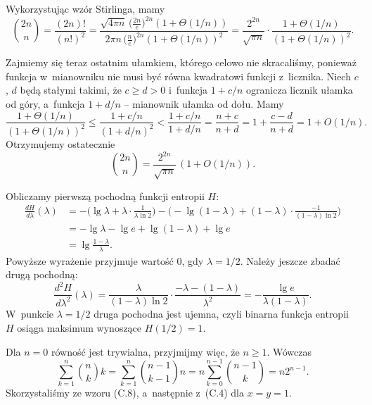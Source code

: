 \exercise %
Wykorzystując wzór Stirlinga, mamy
\[
	\binom{2n}{n} = \frac{(2n)!}{(n!)^2} = \frac{\sqrt{4\pi n}\,\bigl(\frac{2n}{e}\bigr)^{2n}(1+\Theta(1/n))}{2\pi n\,\bigl(\frac{n}{e}\bigr)^{2n}(1+\Theta(1/n))^2} = \frac{2^{2n}}{\sqrt{\pi n}}\cdot\frac{1+\Theta(1/n)}{(1+\Theta(1/n))^2}.
\]

Zajmiemy się teraz ostatnim ułamkiem, którego celowo nie skracaliśmy, ponieważ funkcja w~mianowniku nie musi być równa kwadratowi funkcji z~licznika.
Niech $c$, $d$ będą stałymi takimi, że $c\ge d>0$ i~funkcja $1+c/n$ ogranicza licznik ułamka od góry, a~funkcja $1+d/n$ -- mianownik ułamka od dołu.
Mamy
\[
    \frac{1+\Theta(1/n)}{(1+\Theta(1/n))^2} \le \frac{1+c/n}{(1+d/n)^2} < \frac{1+c/n}{1+d/n} = \frac{n+c}{n+d} = 1+\frac{c-d}{n+d} = 1+O(1/n).
\]
Otrzymujemy ostatecznie
\[
    \binom{2n}{n} = \frac{2^{2n}}{\sqrt{\pi n}}\,(1+O(1/n)).
\]

\exercise %
Obliczamy pierwszą pochodną funkcji entropii $H$:
\begin{align*}
    \frac{dH}{d\lambda}(\lambda) &= -\biggl(\lg\lambda+\lambda\cdot\frac{1}{\lambda\ln2}\biggr)-\biggl(-\lg(1-\lambda)+(1-\lambda)\cdot\frac{-1}{(1-\lambda)\ln2}\biggr) \\[1mm]
	&= -\lg\lambda-\lg e+\lg(1-\lambda)+\lg e \\[1mm]
	&= \lg\frac{1-\lambda}{\lambda}.
\end{align*}
Powyższe wyrażenie przyjmuje wartość 0, gdy $\lambda=1/2$.
Należy jeszcze zbadać drugą pochodną:
\[
	\frac{d^2\!H}{d\lambda^2}(\lambda) = \frac{\lambda}{(1-\lambda)\ln2}\cdot\frac{-\lambda-(1-\lambda)}{\lambda^2} = -\frac{\lg e}{\lambda(1-\lambda)}.
\]
W~punkcie $\lambda=1/2$ druga pochodna jest ujemna, czyli binarna funkcja entropii $H$ osiąga maksimum wynoszące $H(1/2)=1$.

\exercise %
Dla $n=0$ równość jest trywialna, przyjmijmy więc, że $n\ge1$.
Wówczas
\[
	\sum_{k=1}^n\binom{n}{k}k = \sum_{k=1}^n\binom{n-1}{k-1}n = n\sum_{k=0}^{n-1}\binom{n-1}{k} = n2^{n-1}.
\]
Skorzystaliśmy ze wzoru (C.8), a~następnie z~(C.4) dla $x=y=1$.
